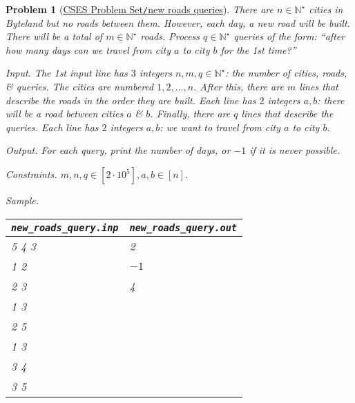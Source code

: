 \documentclass{article}
\newtheorem{problem}{Problem}
\begin{document}
\begin{problem}[\href{https://cses.fi/problemset/task/2101}{CSES Problem Set{\tt/}new roads queries}]
    There are $n\in\mathbb{N}^\star$ cities in Byteland but no roads between them. However, each day, a new road will be built. There will be a total of $m\in\mathbb{N}^\star$ roads. Process $q\in\mathbb{N}^\star$ queries of the form: ``after how many days can we travel from city $a$ to city $b$ for the 1st time?''
    \item {\sf Input.} The 1st input line has $3$ integers $n,m,q\in\mathbb{N}^\star$: the number of cities, roads, \& queries. The cities are numbered $1,2,\ldots,n$. After this, there are $m$ lines that describe the roads in the order they are built. Each line has $2$ integers $a,b$: there will be a road between cities $a$ \& $b$. Finally, there are $q$ lines that describe the queries. Each line has $2$ integers $a,b$: we want to travel from city $a$ to city $b$.
    \item {\sf Output.} For each query, print the number of days, or $-1$ if it is never possible.
    \item {\sf Constraints.} $m,n,q\in[2\cdot10^5],a,b\in[n]$.
    \item {\sf Sample.}
    \begin{table}[H]
        \centering
        \begin{tabular}{|l|l|}
            \hline
            \verb|new_roads_query.inp| & \verb|new_roads_query.out| \\
            \hline
            5 4 3 & 2 \\
            1 2 & $-1$ \\
            2 3 & 4 \\
            1 3 & \\
            2 5 & \\
            1 3 & \\
            3 4 & \\
            3 5 & \\
            \hline
        \end{tabular}
    \end{table}
\end{problem}
\end{document}
